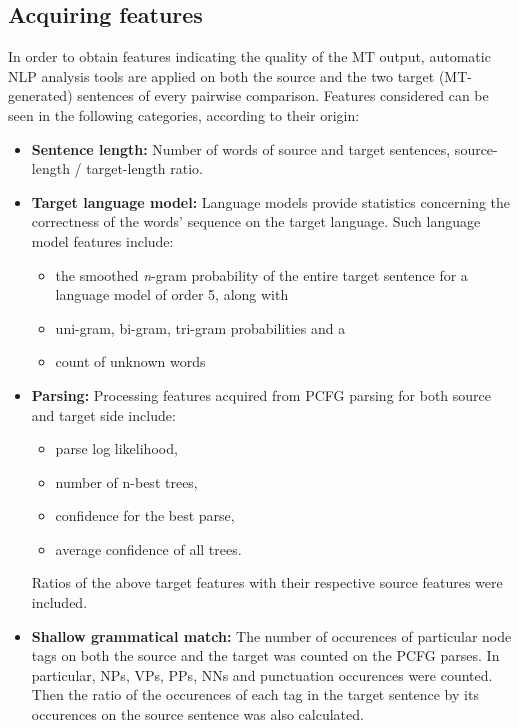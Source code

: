 \documentclass[11pt]{article}
\begin{document}
\subsection{Acquiring features\label{features}}
In order to obtain features indicating the quality of the MT output,
automatic NLP analysis tools are applied on both the source and the two target
(MT-generated) sentences of every pairwise comparison. Features
considered can be seen in the following categories, according to their origin:

\begin{itemize}
  \item \textbf{Sentence length:} Number of words of source and target
  sentences, source-length / target-length ratio. 
  \item \textbf{Target language model:} Language models provide statistics
  concerning the correctness of the words' sequence on the target language. Such
  language model features include:
   \begin{itemize} 
     \item the smoothed \textit{n}-gram probability of   the entire target
     sentence for a language model of order 5, along with
     \item uni-gram, bi-gram, tri-gram probabilities and a 
     \item count of unknown words
    \end{itemize}
  \item \textbf{Parsing:} Processing features acquired from PCFG
  parsing \cite{Petrov06learningaccurate} for both source and target side
  include:
  \begin{itemize}
    \item parse log likelihood, 
    \item number of n-best trees, 
    \item confidence for the best parse,
    \item average confidence of all trees.
   \end{itemize}
    Ratios of the above target features with their respective source features
    were included.
  \item \textbf{Shallow grammatical match:} The number of occurences of
  particular node tags on both the source and the target was counted on
  the PCFG parses. In particular, NPs, VPs, PPs, NNs and punctuation occurences
  were counted. Then the ratio of the occurences of each tag in the target
  sentence by its occurences on the source sentence was also calculated.
\end{itemize}
\end{document}
